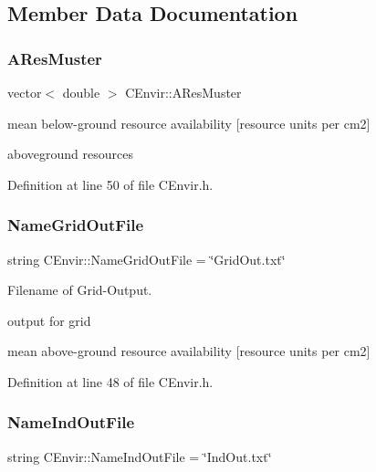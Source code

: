 \subsection{Member Data Documentation}
\mbox{\label{class_c_envir_aab3dd27f5abbda28435498855d39e985}} 
\subsubsection{\texorpdfstring{AResMuster}{AResMuster}}
{\footnotesize\ttfamily vector$<$ double $>$ C\+Envir\+::\+A\+Res\+Muster\hspace{0.3cm}{\ttfamily [static]}}



mean below-\/ground resource availability \mbox{[}resource units per cm2\mbox{]} 

aboveground resources 

Definition at line 50 of file C\+Envir.\+h.

\mbox{\label{class_c_envir_a6ed76bed8230a347eb5cd456f9d12764}} 
\subsubsection{\texorpdfstring{NameGridOutFile}{NameGridOutFile}}
{\footnotesize\ttfamily string C\+Envir\+::\+Name\+Grid\+Out\+File = \char`\"{}Grid\+Out.\+txt\char`\"{}\hspace{0.3cm}{\ttfamily [static]}}



Filename of Grid-\/\+Output. 

output for grid

mean above-\/ground resource availability \mbox{[}resource units per cm2\mbox{]} 

Definition at line 48 of file C\+Envir.\+h.

\mbox{\label{class_c_envir_af43d5a1d6cc67cc053a34fb4f2730cfd}} 
\subsubsection{\texorpdfstring{NameIndOutFile}{NameIndOutFile}}
{\footnotesize\ttfamily string C\+Envir\+::\+Name\+Ind\+Out\+File = \char`\"{}Ind\+Out.\+txt\char`\"{}\hspace{0.3cm}{\ttfamily [static]}}



